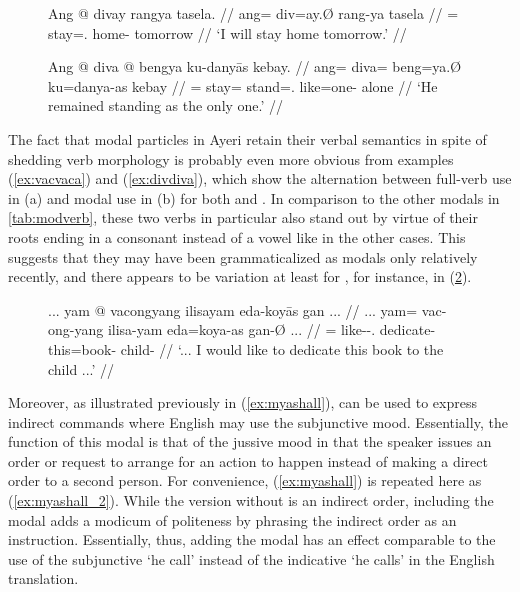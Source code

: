 \begin{figure}[h]
\pex\label{ex:divdiva}
\a\label{ex:divfull}\begingl
	\gla Ang @ divay rangya tasela. //
	\glb ang= div=ay.Ø rang-ya tasela //
	\glc \AgtT{}= stay=\Fsg{}.\Top{} home-\Loc{} tomorrow //
	\glft `I will stay home tomorrow.' //
\endgl

\a\label{ex:divamod}\begingl
	\gla Ang @ diva @ bengya ku-danyās kebay. //
	\glb ang= diva= beng=ya.Ø ku=danya-as kebay //
	\glc \AgtT{}= stay= stand=\TsgM{}.\Top{} like=one-\Parg{} alone //
	\glft `He remained standing as the only one.' //
\endgl
\xe
\end{figure}

The fact that modal particles in Ayeri retain their verbal semantics in spite
of shedding verb morphology is probably even more obvious from examples
(\ref{ex:vacvaca}) and (\ref{ex:divdiva}), which show the alternation between
full-verb use in (a) and modal use in (b) for both  and
. In comparison to the other modals in 
\autoref{tab:modverb}, these two verbs in particular also stand out by virtue 
of their roots ending in a consonant instead of a vowel like in the other 
cases. This suggests that they may have been grammaticalized as modals 
only relatively recently, and there appears to be variation at least for 
, for instance, in (\ref{ex:vacmodfull}).

\begin{figure}[h]
\ex\label{ex:vacmodfull}\begingl
	\gla ... yam @ vacongyang ilisayam eda-koyās gan ... //
	\glb ... yam= vac-ong-yang ilisa-yam eda=koya-as gan-Ø ... //
	\glc {} \DatT{}= like-\Irr{}-\Fsg{}.\Aarg{} dedicate-\Ptcp{} 		
		this=book-\Parg{} child-\Top{} {} //
	\glft `... I would like to dedicate this book to the child ...' 
		 //
\endgl\xe
\end{figure}

Moreover, as illustrated previously in (\ref{ex:myashall}),  can be used to express indirect commands where English may
use the subjunctive mood. Essentially, the function of this modal is that of
the jussive mood in that the speaker issues an order or request to arrange for
an action to happen instead of making a direct order to a second person. For
convenience, (\ref{ex:myashall}) is repeated here as (\ref{ex:myashall_2}).
While the version without  is an indirect order, including the
modal adds a modicum of politeness by phrasing the indirect order as an
instruction. Essentially, thus, adding the modal has an effect comparable to
the use of the subjunctive `he call' instead of the indicative `he calls' in
the English translation.

